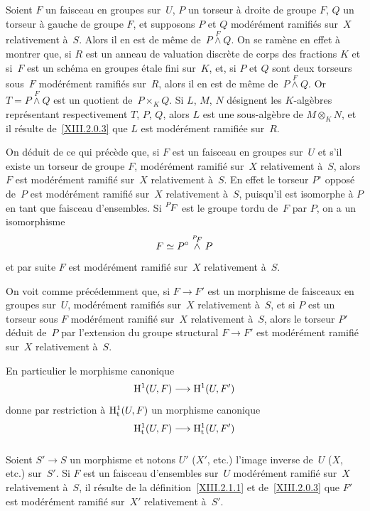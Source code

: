 \subsubsection{}
\label{XIII.2.1.4}
Soient $F$ un faisceau en groupes sur~$U$, $P$ un torseur \`a droite
de groupe $F$, $Q$ un torseur \`a gauche de groupe $F$, et supposons
$P$ et $Q$ mod\'er\'ement ramifi\'es sur~$X$ relativement \`a~$S$. Alors il en est de m\^eme de~$P\stackrel{F}{\wedge}Q$. On se
ram\`ene en effet \`a montrer que, si $R$ est un anneau de
valuation discr\`ete de corps des fractions $K$ et si~$F$ est un
sch\'ema en groupes \'etale fini sur~$K$, et, si $P$ et $Q$ sont
deux torseurs sous~$F$ mod\'er\'ement ramifi\'es sur~$R$, alors
il en est de m\^eme de~$P\stackrel{F}{\wedge} Q$. Or
$T=P\stackrel{F}{\wedge} Q$ est un quotient de~$P\times_K Q$. Si $L$,
$M$, $N$ d\'esignent les $K$-alg\`ebres repr\'esentant
respectivement $T$, $P$, $Q$, alors $L$ est une sous-alg\`ebre de
$M\otimes_K N$, et il r\'esulte de~\ref{XIII.2.0.3} que $L$ est
mod\'er\'ement ramifi\'ee sur~$R$.

On d\'eduit de ce qui pr\'ec\`ede que, si $F$ est un faisceau en
groupes sur~$U$ et s'il existe un torseur de groupe $F$,
mod\'er\'ement ramifi\'e sur~$X$ relativement \`a~$S$, alors
$F$ est mod\'er\'ement ramifi\'e sur~$X$ relativement \`a~$S$. En effet le torseur $P^{\circ}$ oppos\'e de~$P$ est
mod\'er\'ement ramifi\'e sur~$X$ relativement \`a~$S$,
puisqu'il est isomorphe \`a $P$ en tant que faisceau d'ensembles. Si
$\leftexp{P\mkern-4mu}{F}$ est le groupe tordu de~$F$ par $P$, on a un
isomorphisme
$$
F\simeq P^{\circ}\stackrel{\leftexp{P\mkern-4mu}{F}}{\wedge}P
$$
et par suite $F$ est mod\'er\'ement ramifi\'e sur~$X$
relativement \`a~$S$.

On voit comme pr\'ec\'edemment que, si $F\to F'$ est un morphisme
de faisceaux en groupes sur~$U$, mod\'er\'ement ramifi\'es sur~$X$ relativement \`a~$S$, et si $P$ est un torseur sous $F$
mod\'er\'ement ramifi\'e sur~$X$ relativement
\`a~$S$, alors le torseur $P'$ d\'eduit de~$P$ par l'extension du
groupe structural $F\to F'$ est mod\'er\'ement ramifi\'e sur~$X$
relativement \`a~$S$.

En particulier le morphisme canonique
$$
\H^1(U,F)\to \H^1(U,F')
$$
donne par restriction \`a $\mathrm{H}^1_{\mathrm{t}}(U,F)$ un morphisme canonique
$$
\H^1_{\tame}(U,F)\to\H^1_{\tame}(U,F')
$$

\subsubsection{}
\label{XIII.2.1.5}
Soient $S'\to S$ un morphisme et notons $U'$ (\resp $X'$, etc.)
l'image inverse de~$U$ (\resp $X$, etc.) sur~$S'$. Si $F$ est un
faisceau d'ensembles sur~$U$ mod\'er\'ement ramifi\'e sur~$X$
relativement \`a~$S$, il r\'esulte de la
d\'efinition~\ref{XIII.2.1.1} et de~\ref{XIII.2.0.3} que $F'$ est
mod\'er\'ement ramifi\'e sur~$X'$ relativement \`a~$S'$.

